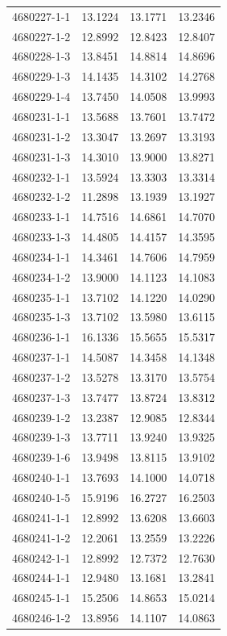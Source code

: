 \begin{longtable}{lrrr}
4680227-1-1 & 13.1224 & 13.1771 & 13.2346 \\
4680227-1-2 & 12.8992 & 12.8423 & 12.8407 \\
4680228-1-3 & 13.8451 & 14.8814 & 14.8696 \\
4680229-1-3 & 14.1435 & 14.3102 & 14.2768 \\
4680229-1-4 & 13.7450 & 14.0508 & 13.9993 \\
4680231-1-1 & 13.5688 & 13.7601 & 13.7472 \\
4680231-1-2 & 13.3047 & 13.2697 & 13.3193 \\
4680231-1-3 & 14.3010 & 13.9000 & 13.8271 \\
4680232-1-1 & 13.5924 & 13.3303 & 13.3314 \\
4680232-1-2 & 11.2898 & 13.1939 & 13.1927 \\
4680233-1-1 & 14.7516 & 14.6861 & 14.7070 \\
4680233-1-3 & 14.4805 & 14.4157 & 14.3595 \\
4680234-1-1 & 14.3461 & 14.7606 & 14.7959 \\
4680234-1-2 & 13.9000 & 14.1123 & 14.1083 \\
4680235-1-1 & 13.7102 & 14.1220 & 14.0290 \\
4680235-1-3 & 13.7102 & 13.5980 & 13.6115 \\
4680236-1-1 & 16.1336 & 15.5655 & 15.5317 \\
4680237-1-1 & 14.5087 & 14.3458 & 14.1348 \\
4680237-1-2 & 13.5278 & 13.3170 & 13.5754 \\
4680237-1-3 & 13.7477 & 13.8724 & 13.8312 \\
4680239-1-2 & 13.2387 & 12.9085 & 12.8344 \\
4680239-1-3 & 13.7711 & 13.9240 & 13.9325 \\
4680239-1-6 & 13.9498 & 13.8115 & 13.9102 \\
4680240-1-1 & 13.7693 & 14.1000 & 14.0718 \\
4680240-1-5 & 15.9196 & 16.2727 & 16.2503 \\
4680241-1-1 & 12.8992 & 13.6208 & 13.6603 \\
4680241-1-2 & 12.2061 & 13.2559 & 13.2226 \\
4680242-1-1 & 12.8992 & 12.7372 & 12.7630 \\
4680244-1-1 & 12.9480 & 13.1681 & 13.2841 \\
4680245-1-1 & 15.2506 & 14.8653 & 15.0214 \\
4680246-1-2 & 13.8956 & 14.1107 & 14.0863 \\

\end{longtable}
